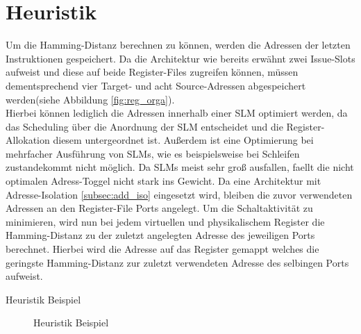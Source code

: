 \section{Heuristik}
\label{sec:Heuristik}

Um die Hamming-Distanz berechnen zu können, werden die Adressen der letzten Instruktionen gespeichert. Da die Architektur wie bereits erwähnt zwei Issue-Slots aufweist und diese auf beide Register-Files zugreifen können, müssen dementsprechend vier Target- und acht Source-Adressen abgespeichert werden(siehe Abbildung \ref{fig:reg_orga}).\\
Hierbei können lediglich die Adressen innerhalb einer SLM optimiert werden, da das Scheduling über die Anordnung der SLM entscheidet und die Register-Allokation diesem untergeordnet ist. Außerdem ist eine Optimierung bei mehrfacher Ausführung von SLMs, wie es beispielsweise bei Schleifen zustandekommt nicht möglich. Da SLMs meist sehr groß ausfallen, faellt die nicht optimalen Adress-Toggel nicht stark ins Gewicht.
Da eine Architektur mit Adresse-Isolation \ref{subsec:add_iso} eingesetzt wird, bleiben die zuvor verwendeten Adressen an den Register-File Ports angelegt. Um die Schaltaktivität zu minimieren, wird nun bei jedem virtuellen und physikalischem Register die Hamming-Distanz zu der zuletzt angelegten Adresse des jeweiligen Ports berechnet. Hierbei wird die Adresse auf das Register gemappt welches die geringste Hamming-Distanz zur zuletzt verwendeten Adresse des selbingen Ports aufweist.\\

\begin{algorithm}[H]
	\begin{algorithmic}[1]
		\caption{Heuristik Beispiel}
		\label{code:heuristik}
\end{algorithmic}
\end{algorithm}

\begin{figure}[htbp] 
	\centering
	
	\caption{Heuristik Beispiel}
	\label{fig:heuristik}
\end{figure}

